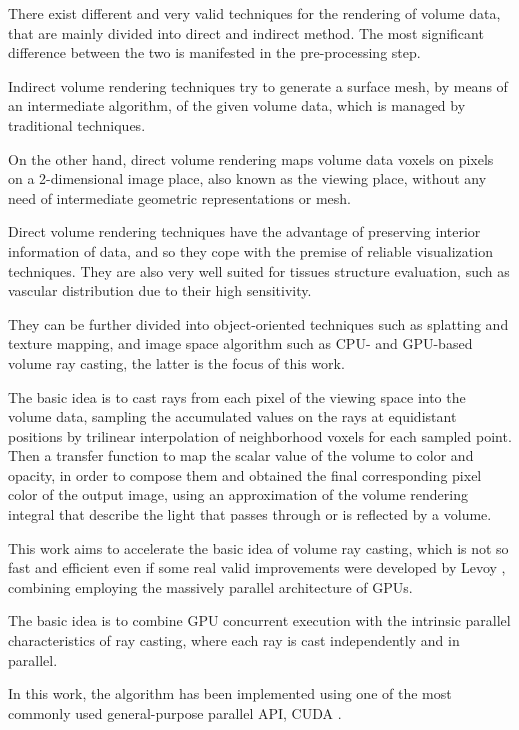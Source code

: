 \documentclass[12pt,a4paper]{extarticle}
\newcommand{\linespace}{\vspace{8pt}}
\begin{document}
There exist different and very valid techniques for the rendering of volume data, that are mainly divided into direct and indirect method. The most significant difference between the two is manifested in the pre-processing step.

Indirect volume rendering techniques try to generate a surface mesh, by means of an intermediate algorithm, of the given volume data, which is managed by traditional techniques.

On the other hand, direct volume rendering maps volume data voxels on pixels on a 2-dimensional image place, also known as the viewing place, without any need of intermediate geometric representations or mesh.

Direct volume rendering techniques have the advantage of preserving interior information of data, and so they cope with the premise of reliable visualization techniques. They are also very well suited for tissues structure evaluation, such as vascular distribution due to their high sensitivity.

They can be further divided into object-oriented techniques such as splatting and texture mapping, and image space algorithm such as CPU- and GPU-based volume ray casting, the latter is the focus of this work.

The basic idea is to cast rays from each pixel of the
viewing space into the volume data, sampling the accumulated values on the rays at equidistant positions by trilinear interpolation of neighborhood voxels for each sampled point. Then a transfer function to map the scalar value of
the volume to color and opacity, in order to compose them and obtained the final corresponding pixel color of the output image, using an approximation of the volume rendering integral that describe the light that passes through or is reflected by a volume.
\linespace

This work aims to accelerate the basic idea of volume ray casting, which is not so fast and efficient even if some real valid improvements were developed by Levoy \cite{levoy_1990:5}, combining employing the massively parallel architecture of GPUs.

The basic idea is to combine GPU concurrent execution with the intrinsic parallel characteristics of ray casting, where each ray is cast independently and in parallel.
\linespace

In this work, the algorithm has been implemented using one of the most commonly used general-purpose parallel API, CUDA \cite{nvidia:12}.
\end{document}
